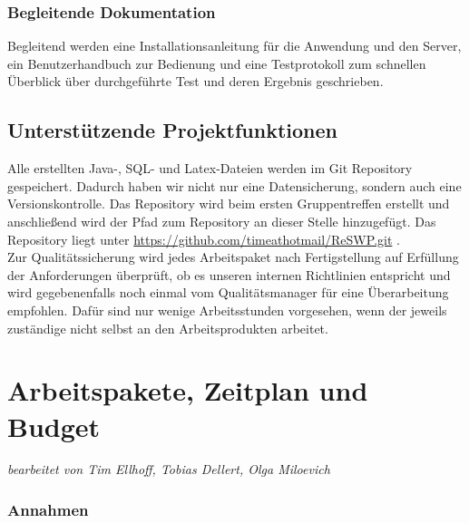 \documentclass[fontsize=12pt,paper=a4,twoside]{scrartcl}
\begin{document}
\subsubsection{Begleitende Dokumentation}

Begleitend werden eine Installationsanleitung für die Anwendung und den Server, ein Benutzerhandbuch zur Bedienung und eine Testprotokoll zum schnellen Überblick über durchgeführte Test und deren Ergebnis geschrieben.

\subsection{Unterstützende Projektfunktionen}

Alle erstellten Java-, SQL- und Latex-Dateien werden im Git Repository gespeichert. Dadurch haben wir nicht nur eine Datensicherung, sondern auch eine Versionskontrolle. Das Repository wird beim ersten Gruppentreffen erstellt und anschließend wird der Pfad zum Repository an dieser Stelle hinzugefügt. Das Repository liegt unter \url{https://github.com/timeathotmail/ReSWP.git} .\\
Zur Qualitätssicherung wird jedes Arbeitspaket nach Fertigstellung auf Erfüllung der Anforderungen überprüft, ob es unseren internen Richtlinien entspricht und wird gegebenenfalls noch einmal vom Qualitätsmanager für eine Überarbeitung empfohlen. Dafür sind nur wenige Arbeitsstunden vorgesehen, wenn der jeweils zuständige nicht selbst an den Arbeitsprodukten arbeitet.



\section{Arbeitspakete, Zeitplan und Budget}

\textit{bearbeitet von Tim Ellhoff, Tobias Dellert, Olga Miloevich}

\subsubsection{Annahmen}\label{aps}
\end{document}
